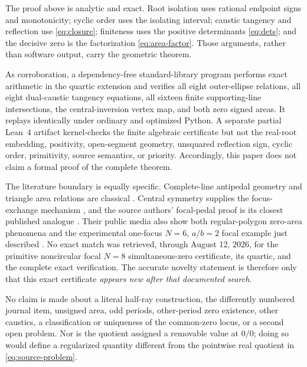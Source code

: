\documentclass[11pt,a4paper]{amsart}
\theoremstyle{definition}
\theoremstyle{remark}
\begin{document}
The proof above is analytic and exact.  Root isolation uses rational endpoint
signs and monotonicity; cyclic order uses the isolating interval; caustic
tangency and reflection use \eqref{eq:closure}; finiteness uses the positive
determinants \eqref{eq:dets}; and the decisive zero is the factorization
\eqref{eq:area-factor}.  Those arguments, rather than software output, carry
the geometric theorem.

As corroboration, a dependency-free standard-library program performs exact
arithmetic in the quartic extension and verifies all eight outer-ellipse
relations, all eight dual-caustic tangency equations, all sixteen finite
supporting-line intersections, the central-inversion vertex map, and both
zero signed areas.  It replays identically under ordinary and optimized
Python.  A separate partial Lean~4 artifact kernel-checks the finite algebraic
certificate but not the real-root embedding, positivity, open-segment
geometry, unsquared reflection sign, cyclic order, primitivity, source
semantics, or priority.  Accordingly, this paper does not claim a formal proof
of the complete theorem.

The literature boundary is equally specific.  Complete-line antipedal
geometry and triangle area relations are classical
\cite{Gallatly1910,Mitrea2010}.  Central symmetry supplies the focus-exchange
mechanism \cite{Stachel2021}, and the source authors' focal-pedal proof is its
closest published analogue \cite{ReznikGarciaKoiller2021}.  Their public media
also show both regular-polygon zero-area phenomena and the experimental
one-focus $N=6$, $a/b=2$ focal example just described
\cite{Reznik2020Regular,Reznik2020N6Focus,ReznikMediaIndex}.
No exact match was retrieved, through August 12, 2026, for the primitive
noncircular focal $N=8$ simultaneous-zero certificate, its quartic, and the
complete exact verification.  The accurate novelty statement is therefore
only that this exact certificate \emph{appears new after that documented
search}.

No claim is made about a literal half-ray construction, the differently
numbered journal item, unsigned area, odd periods, other-period zero
existence, other caustics, a classification or uniqueness of the common-zero
locus, or a second open problem.  Nor is the quotient assigned a removable
value at $0/0$; doing so would define a regularized quantity different from
the pointwise real quotient in \eqref{eq:source-problem}.



\end{document}

